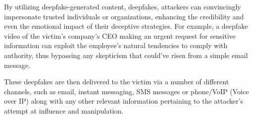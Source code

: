 By utilizing deepfake-generated content, deepfakes, attackers can convincingly impersonate trusted individuals or organizations, enhancing the credibility and even the emotional impact of their deceptive strategies. For example, a deepfake video of the victim's company's CEO making an urgent request for sensitive information can exploit the employee's natural tendencies to comply with authority, thus bypassing any skepticism that could've risen from a simple email message.

These deepfakes are then delivered to the victim via a number of different channels, such as email, instant messaging, SMS messages or phone/VoIP (Voice over IP) along with any other relevant information pertaining to the attacker's attempt at influence and manipulation.



\begin{comment}
    
    - 

\end{comment}

